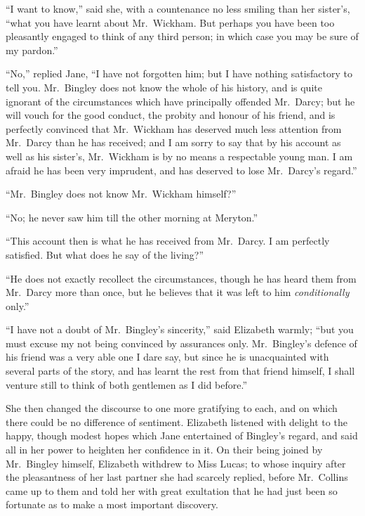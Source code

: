 “I want to know,” said she, with a countenance no
less smiling than her sister’s, “what you have learnt
about Mr.\ Wickham. But perhaps you have been too
pleasantly engaged to think of any third person; in which
case you may be sure of my pardon.”

“No,” replied Jane, “I have not forgotten him; but
I have nothing satisfactory to tell you. Mr.\ Bingley does
not know the whole of his history, and is quite ignorant
of the circumstances which have principally offended
Mr.\ Darcy; but he will vouch for the good conduct, the
probity and honour of his friend, and is perfectly convinced
that Mr.\ Wickham has deserved much less attention from
Mr.\ Darcy than he has received; and I am sorry to say
that by his account as well as his sister’s, Mr.\ Wickham
is by no means a respectable young man. I am afraid
he has been very imprudent, and has deserved to lose
Mr.\ Darcy’s regard.”

“Mr.\ Bingley does not know Mr.\ Wickham himself?”

“No; he never saw him till the other morning at
Meryton.”

“This account then is what he has received from
Mr.\ Darcy. I am perfectly satisfied. But what does he
say of the living?”

“He does not exactly recollect the circumstances,
though he has heard them from Mr.\ Darcy more than
once, but he believes that it was left to him \textit{conditionally}
only.”

“I have not a doubt of Mr.\ Bingley’s sincerity,” said
Elizabeth warmly; “but you must excuse my not being
convinced by assurances only. Mr.\ Bingley’s defence of
his friend was a very able one I dare say, but since he
is unacquainted with several parts of the story, and has
learnt the rest from that friend himself, I shall venture
still to think of both gentlemen as I did before.”

She then changed the discourse to one more gratifying
to each, and on which there could be no difference of
sentiment. Elizabeth listened with delight to the happy,
though modest hopes which Jane entertained of Bingley’s
regard, and said all in her power to heighten her confidence
in it. On their being joined by Mr.\ Bingley
himself, Elizabeth withdrew to Miss Lucas; to whose
inquiry after the pleasantness of her last partner she had
scarcely replied, before Mr.\ Collins came up to them and
told her with great exultation that he had just been so
fortunate as to make a most important discovery.

